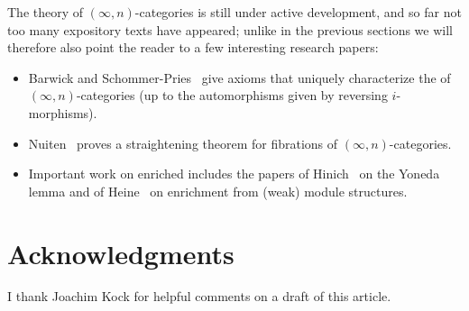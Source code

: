 \documentclass[a4paper,11pt]{article}
\begin{document}
The theory of $(\infty,n)$-categories is still under active
development, and so far not too many expository texts have appeared;
unlike in the previous sections we will therefore also point the
reader to a few interesting research papers:
\begin{itemize}
\item Barwick and Schommer-Pries~\cite{BSP} give axioms that uniquely
  characterize the \icat{} of $(\infty,n)$-categories (up to the
  automorphisms given by reversing $i$-morphisms).
\item Nuiten~\cite{Nuiten} proves a straightening theorem for
  fibrations of $(\infty,n)$-categories.
\item Important work on enriched \icats{} includes the papers of
  Hinich~\cite{HinichYoneda} on the Yoneda lemma and of
  Heine~\cite{Heine} on enrichment from (weak) module structures.
\end{itemize}

\section*{Acknowledgments}
I thank Joachim Kock for helpful comments on a draft of this article.
\end{document}
